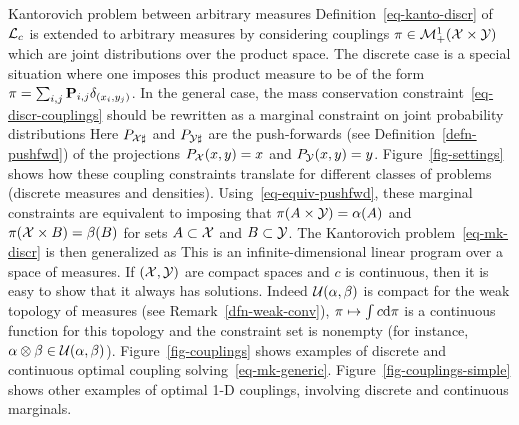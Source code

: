 \begin{rem2}{Kantorovich problem between arbitrary measures} De\-fi\-ni\-tion~\eqref{eq-kanto-discr} of $\mathcal{L}_c$ is extended to arbitrary measures by considering couplings $\pi \in \mathcal{M}_+^1(\mathcal{X} \times \mathcal{Y})$ which are joint distributions over the product space. The discrete case is a special situation where one imposes this product measure to be of the form $\pi = \sum_{i,j} \mathrm{\textbf{P}}_{i,j} \delta_{(x_i,y_j)}$. In the general case, the mass conservation constraint~\eqref{eq-discr-couplings} should be rewritten as a marginal constraint on joint probability distributions
Here $P_{\mathcal{X}\sharp}$ and $P_{\mathcal{Y}\sharp}$ are the push-forwards (see Definition~\ref{defn-pushfwd}) of the projections $P_{\mathcal{X}}(x,y)=x$ and $P_{\mathcal{Y}}(x,y)=y$.
%
Figure~\ref{fig-settings} shows how these coupling constraints translate for different classes of problems (discrete measures and densities).
%
Using~\eqref{eq-equiv-pushfwd}, these marginal constraints are equivalent to imposing that $\pi(A \times \mathcal{Y})=\alpha(A)$ and $\pi(\mathcal{X} \times B)=\beta(B)$ for sets $A \subset \mathcal{X}$ and $B \subset \mathcal{Y}$.
%
The Kantorovich problem~\eqref{eq-mk-discr} is then generalized as
This is an infinite-dimensional linear program over a space of measures. If $(\mathcal{X},\mathcal{Y})$ are compact spaces and $c$ is continuous, then it is easy to show that it always has solutions. Indeed $\mathcal{U}(\alpha,\beta)$ is compact for the weak topology of measures (see Remark~\ref{dfn-weak-conv}), $\pi \mapsto \int c \mathrm{d}\pi$ is a continuous function for this topology and the constraint set is nonempty (for instance, $\alpha \otimes \beta \in \mathcal{U}(\alpha,\beta)$).
%
Figure~\ref{fig-couplings} shows examples of discrete and continuous optimal coupling solving~\eqref{eq-mk-generic}.
%
Figure~\ref{fig-couplings-simple} shows other examples of optimal 1-D couplings, involving discrete and continuous marginals.
%
\end{rem2}

